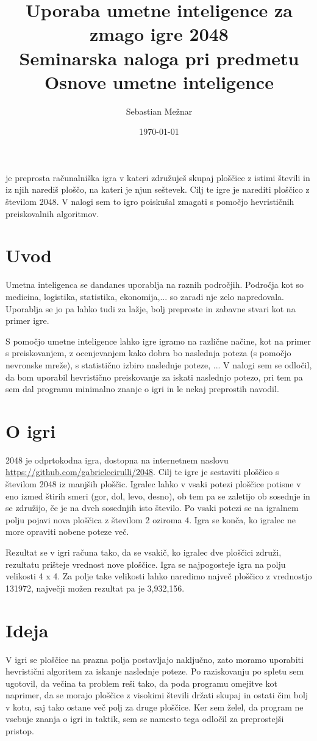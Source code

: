 \documentclass[a4paper,11pt]{article}
\author{Sebastian Mežnar}
\title{
Uporaba umetne inteligence za zmago igre 2048\\
\large Seminarska naloga pri predmetu Osnove umetne inteligence
}
\date{\today}
\begin{document}
\maketitle

  je preprosta računalniška igra v kateri združuješ skupaj ploščice z istimi števili in iz njih narediš ploščo, na kateri je njun seštevek. Cilj te igre je narediti ploščico z številom 2048. V nalogi sem to igro poiskušal zmagati s pomočjo hevrističnih preiskovalnih algoritmov.

\section{Uvod}
Umetna inteligenca se dandanes uporablja na raznih področjih. Področja kot so medicina, logistika, statistika, ekonomija,... so zaradi nje zelo napredovala. Uporablja se jo pa lahko tudi za lažje, bolj preproste in zabavne stvari kot na primer igre.

S pomočjo umetne inteligence lahko igre igramo na različne načine, kot na primer s preiskovanjem, z ocenjevanjem kako dobra bo naslednja poteza (s pomočjo nevronske mreže), s statistično izbiro naslednje poteze, ... V nalogi sem se odločil, da bom uporabil hevristično preiskovanje za iskati naslednjo potezo, pri tem pa sem dal programu minimalno znanje o igri in le nekaj preprostih navodil.

\section{O igri}
2048 je odprtokodna igra, dostopna na internetnem naslovu \href{https://github.com/gabrielecirulli/2048}{https://github.com/gabrielecirulli/2048}. Cilj te igre je sestaviti ploščico s številom 2048 iz manjših ploščic. Igralec lahko v vsaki potezi ploščice potisne v eno izmed štirih smeri (gor, dol, levo, desno), ob tem pa se zaletijo ob sosednje in se združijo, če je na dveh sosednjih isto število. Po vsaki potezi se na igralnem polju pojavi nova ploščica z številom 2 oziroma 4. Igra se konča, ko igralec ne more opraviti nobene poteze več.

Rezultat se v igri računa tako, da se vsakič, ko igralec dve ploščici združi, rezultatu prišteje vrednost nove ploščice. Igra se najpogosteje igra na polju velikosti 4 x 4. Za polje take velikosti lahko naredimo največ ploščico z vrednostjo 131972, največji možen rezultat pa je 3,932,156.

\section{Ideja}
V igri se ploščice na prazna polja postavljajo naključno, zato moramo uporabiti hevristični algoritem za iskanje naslednje poteze. Po raziskovanju po spletu sem ugotovil, da večina ta problem reši tako, da poda programu omejitve kot naprimer, da se morajo ploščice z visokimi števili držati skupaj in ostati čim bolj v kotu, saj tako ostane več polj za druge ploščice. Ker sem želel, da program ne vsebuje znanja o igri in taktik, sem se namesto tega odločil za preprostejši pristop.
\end{document}
